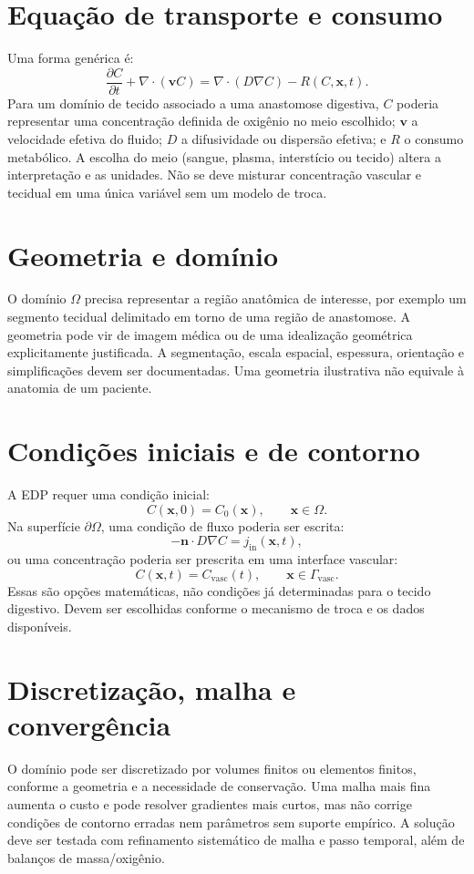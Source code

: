 \documentclass[11pt,a4paper,oneside]{book}
\newcommand{\pder}[2]{\frac{\partial #1}{\partial #2}}
\begin{document}
\section{Equação de transporte e consumo}
Uma forma genérica é:
\begin{equation}
\pder{C}{t}+\nabla\cdot(\bm v C)
=\nabla\cdot(D\nabla C)-R(C,\bm x,t).
\end{equation}
Para um domínio de tecido associado a uma anastomose digestiva, $C$ poderia representar uma concentração definida de oxigênio no meio escolhido; $\bm v$ a velocidade efetiva do fluido; $D$ a difusividade ou dispersão efetiva; e $R$ o consumo metabólico. A escolha do meio (sangue, plasma, interstício ou tecido) altera a interpretação e as unidades. Não se deve misturar concentração vascular e tecidual em uma única variável sem um modelo de troca.

\section{Geometria e domínio}
O domínio $\Omega$ precisa representar a região anatômica de interesse, por exemplo um segmento tecidual delimitado em torno de uma região de anastomose. A geometria pode vir de imagem médica ou de uma idealização geométrica explicitamente justificada. A segmentação, escala espacial, espessura, orientação e simplificações devem ser documentadas. Uma geometria ilustrativa não equivale à anatomia de um paciente.

\section{Condições iniciais e de contorno}
A EDP requer uma condição inicial:
\[
C(\bm x,0)=C_0(\bm x),\qquad \bm x\in\Omega.
\]
Na superfície $\partial\Omega$, uma condição de fluxo poderia ser escrita:
\[
-\bm n\cdot D\nabla C=j_{\mathrm{in}}(\bm x,t),
\]
ou uma concentração poderia ser prescrita em uma interface vascular:
\[
C(\bm x,t)=C_{\mathrm{vasc}}(t),\qquad \bm x\in\Gamma_{\mathrm{vasc}}.
\]
Essas são opções matemáticas, não condições já determinadas para o tecido digestivo. Devem ser escolhidas conforme o mecanismo de troca e os dados disponíveis.

\section{Discretização, malha e convergência}
O domínio pode ser discretizado por volumes finitos ou elementos finitos, conforme a geometria e a necessidade de conservação. Uma malha mais fina aumenta o custo e pode resolver gradientes mais curtos, mas não corrige condições de contorno erradas nem parâmetros sem suporte empírico. A solução deve ser testada com refinamento sistemático de malha e passo temporal, além de balanços de massa/oxigênio.
\end{document}
